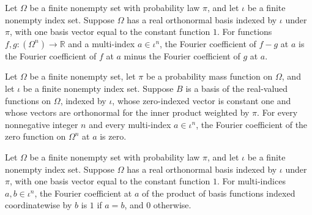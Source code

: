 \begin{theorem}
\label{FABL.FiniteFourierBasis.fourierCoeff_sub}
\leanok
{}
Let $\Omega$ be a finite nonempty set with probability law $\pi$, and let $\iota$ be a
finite nonempty index set. Suppose $\Omega$ has a real orthonormal basis indexed by
$\iota$ under $\pi$, with one basis vector equal to the constant function $1$. For
functions $f,g:(\Omega^n)\to\mathbb R$ and a multi-index $a\in\iota^n$, the Fourier
coefficient of $f-g$ at $a$ is the Fourier coefficient of $f$ at $a$ minus the Fourier
coefficient of $g$ at $a$.
\end{theorem}

\begin{theorem}
\label{FABL.FiniteFourierBasis.fourierCoeff_zero}
\leanok
{}
Let $\Omega$ be a finite nonempty set, let $\pi$ be a probability mass function on
$\Omega$, and let $\iota$ be a finite nonempty index set. Suppose $B$ is a basis of the
real-valued functions on $\Omega$, indexed by $\iota$, whose zero-indexed vector is
constant one and whose vectors are orthonormal for the inner product weighted by $\pi$.
For every nonnegative integer $n$ and every multi-index $a\in\iota^n$, the Fourier
coefficient of the zero function on $\Omega^n$ at $a$ is zero.
\end{theorem}

\begin{theorem}
\label{FABL.FiniteFourierBasis.fourierCoeff_productFunction}
\leanok
{}
Let $\Omega$ be a finite nonempty set with probability law $\pi$, and let $\iota$ be a
finite nonempty index set. Suppose $\Omega$ has a real orthonormal basis indexed by
$\iota$ under $\pi$, with one basis vector equal to the constant function $1$. For
multi-indices $a,b\in\iota^n$, the Fourier coefficient at $a$ of the product of basis
functions indexed coordinatewise by $b$ is $1$ if $a=b$, and $0$ otherwise.
\end{theorem}

